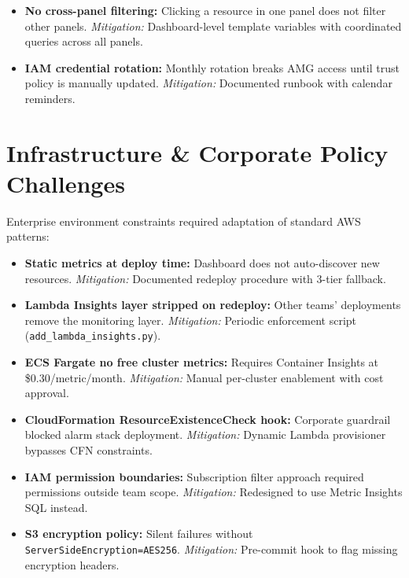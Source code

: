 \begin{itemize}
    \item \textbf{No cross-panel filtering:} Clicking a resource in one panel
          does not filter other panels.
          \textit{Mitigation:} Dashboard-level template variables with
          coordinated queries across all panels.

    \item \textbf{IAM credential rotation:} Monthly rotation breaks AMG access
          until trust policy is manually updated.
          \textit{Mitigation:} Documented runbook with calendar reminders.
\end{itemize}


\FloatBarrier

\section{Infrastructure \& Corporate Policy Challenges}
\label{sec:challenges-infra}


Enterprise environment constraints required adaptation of standard AWS patterns:

\begin{itemize}
    \item \textbf{Static metrics at deploy time:} Dashboard does not auto-discover
          new resources.
          \textit{Mitigation:} Documented redeploy procedure with 3-tier fallback.

    \item \textbf{Lambda Insights layer stripped on redeploy:} Other teams'
          deployments remove the monitoring layer.
          \textit{Mitigation:} Periodic enforcement script
          (\texttt{add\_lambda\_insights.py}).

    \item \textbf{ECS Fargate no free cluster metrics:} Requires Container
          Insights at \$0.30/metric/month.
          \textit{Mitigation:} Manual per-cluster enablement with cost approval.

    \item \textbf{CloudFormation ResourceExistenceCheck hook:} Corporate guardrail
          blocked alarm stack deployment.
          \textit{Mitigation:} Dynamic Lambda provisioner bypasses CFN constraints.

    \item \textbf{IAM permission boundaries:} Subscription filter approach required
          permissions outside team scope.
          \textit{Mitigation:} Redesigned to use Metric Insights SQL instead.

    \item \textbf{S3 encryption policy:} Silent failures without
          \texttt{ServerSideEncryption=AES256}.
          \textit{Mitigation:} Pre-commit hook to flag missing encryption headers.
\end{itemize}


